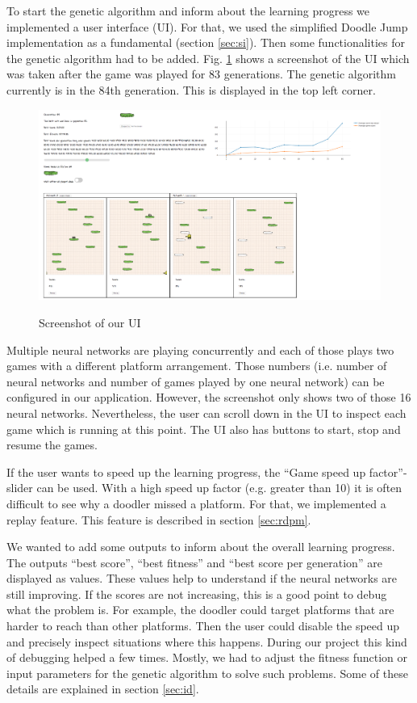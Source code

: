 \documentclass[a4paper,12pt,pagesize,headsepline,bibtotoc,titlepage,abstracton]{scrartcl}
\begin{document}
To start the genetic algorithm and inform about the learning progress we implemented a user interface (UI). For that, we used the simplified Doodle Jump implementation as a fundamental (section \ref{sec:si}). Then some functionalities for the genetic algorithm had to be added. Fig. \ref{abb:ui} shows a screenshot of the UI which was taken after the game was played for 83 generations. The genetic algorithm currently is in the 84th generation. This is displayed in the top left corner.

\begin{figure}[h]
\begin{center}
\includegraphics*[width=1\textwidth]{images/ui}\\
\caption{Screenshot of our UI}
\label{abb:ui}
\end{center}
\end{figure}

Multiple neural networks are playing concurrently and each of those plays two games with a different platform arrangement. Those numbers (i.e. number of neural networks and number of games played by one neural network) can be configured in our application. However, the screenshot only shows two of those 16 neural networks. Nevertheless, the user can scroll down in the UI to inspect each game which is running at this point. The UI also has buttons to start, stop and resume the games.

If the user wants to speed up the learning progress, the ``Game speed up factor''-slider can be used. With a high speed up factor (e.g. greater than 10) it is often difficult to see why a doodler missed a platform. For that, we implemented a replay feature. This feature is described in section \ref{sec:rdpm}.

We wanted to add some outputs to inform about the overall learning progress. The outputs ``best score'', ``best fitness'' and ``best score per generation'' are displayed as values. These values help to understand if the neural networks are still improving. If the scores are not increasing, this is a good point to debug what the problem is. For example, the doodler could target platforms that are harder to reach than other platforms. Then the user could disable the speed up and  precisely inspect situations where this happens. During our project this kind of debugging helped a few times. Mostly, we had to adjust the fitness function or input parameters for the genetic algorithm to solve such problems. Some of these details are explained in section \ref{sec:id}.
\end{document}
